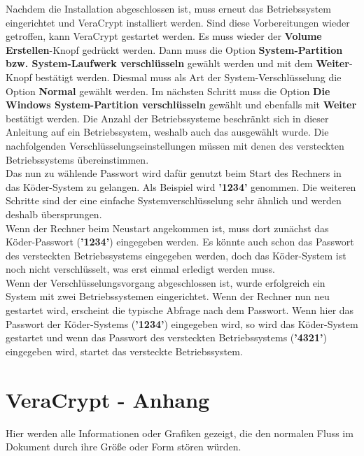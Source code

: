 \documentclass[12pt,a4paper]{scrreprt}
\begin{document}
\noindent Nachdem die Installation abgeschlossen ist, muss erneut das Betriebssystem eingerichtet und VeraCrypt installiert werden. Sind diese Vorbereitungen wieder getroffen, kann VeraCrypt gestartet werden. Es muss wieder der \textbf{Volume Erstellen}-Knopf gedrückt werden. Dann muss die Option \textbf{System-Partition bzw. System-Laufwerk verschlüsseln} gewählt werden und mit dem \textbf{Weiter}-Knopf bestätigt werden. Diesmal muss als Art der System-Verschlüsselung die Option \textbf{Normal} gewählt werden. Im nächsten Schritt muss die Option \textbf{Die Windows System-Partition verschlüsseln} gewählt und ebenfalls mit \textbf{Weiter} bestätigt werden. Die Anzahl der Betriebssysteme beschränkt sich in dieser Anleitung auf ein Betriebssystem, weshalb auch das ausgewählt wurde. Die nachfolgenden Verschlüsselungseinstellungen müssen mit denen des versteckten Betriebssystems übereinstimmen. \\

\noindent Das nun zu wählende Passwort wird dafür genutzt beim Start des Rechners in das Köder-System zu gelangen. Als Beispiel wird \textbf{'1234'} genommen. Die weiteren Schritte sind der eine einfache Systemverschlüsselung sehr ähnlich und werden deshalb übersprungen. \\

\noindent Wenn der Rechner beim Neustart angekommen ist, muss dort zunächst das Köder-Passwort (\textbf{'1234'}) eingegeben werden. Es könnte auch schon das Passwort des versteckten Betriebssystems eingegeben werden, doch das Köder-System ist noch nicht verschlüsselt, was erst einmal erledigt werden muss. \\

\noindent Wenn der Verschlüsselungsvorgang abgeschlossen ist, wurde erfolgreich ein System mit zwei Betriebssystemen eingerichtet. Wenn der Rechner nun neu gestartet wird, erscheint die typische Abfrage nach dem Passwort. Wenn hier das Passwort der Köder-Systems (\textbf{'1234'}) eingegeben wird, so wird das Köder-System gestartet und wenn das Passwort des versteckten Betriebssystems (\textbf{'4321'}) eingegeben wird, startet das versteckte Betriebssystem.

\chapter{VeraCrypt - Anhang}
Hier werden alle Informationen oder Grafiken gezeigt, die den normalen Fluss im Dokument durch ihre Größe oder Form stören würden.
\end{document}
